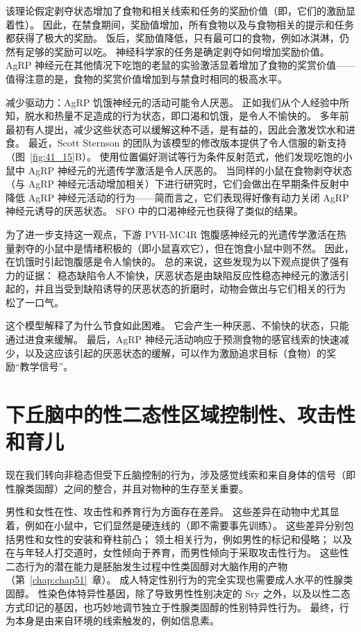 该理论假定剥夺状态增加了食物和相关线索和任务的奖励价值（即，它们的激励显着性）。
因此，在禁食期间，奖励值增加，所有食物以及与食物相关的提示和任务都获得了极大的奖励。
饭后，奖励值降低，只有最可口的食物，例如冰淇淋，仍然有足够的奖励可以吃。
神经科学家的任务是确定剥夺如何增加奖励价值。
AgRP 神经元在其他情况下吃饱的老鼠的实验激活显着增加了食物的奖赏价值——值得注意的是，食物的奖赏价值增加到与禁食时相同的极高水平。


减少驱动力：AgRP 饥饿神经元的活动可能令人厌恶。
正如我们从个人经验中所知，脱水和热量不足造成的行为状态，即口渴和饥饿，是令人不愉快的。
多年前最初有人提出，减少这些状态可以缓解这种不适，是有益的，因此会激发饮水和进食。
最近，Scott Sternson 的团队为该模型的修改版本提供了令人信服的新支持（图~\ref{fig:41_15}B）。
使用位置偏好测试等行为条件反射范式，他们发现吃饱的小鼠中 AgRP 神经元的光遗传学激活是令人厌恶的。
当同样的小鼠在食物剥夺状态（与 AgRP 神经元活动增加相关）下进行研究时，它们会做出在早期条件反射中降低 AgRP 神经元活动的行为——简而言之，它们表现得好像有动力关闭 AgRP 神经元诱导的厌恶状态。
SFO 中的口渴神经元也获得了类似的结果。


为了进一步支持这一观点，下游 PVH-MC4R 饱腹感神经元的光遗传学激活在热量剥夺的小鼠中是情绪积极的（即小鼠喜欢它），但在饱食小鼠中则不然。
因此，在饥饿时引起饱腹感是令人愉快的。
总的来说，这些发现为以下观点提供了强有力的证据：
稳态缺陷令人不愉快，厌恶状态是由缺陷反应性稳态神经元的激活引起的，并且当受到缺陷诱导的厌恶状态的折磨时，动物会做出与它们相关的行为 松了一口气。


这个模型解释了为什么节食如此困难。
它会产生一种厌恶、不愉快的状态，只能通过进食来缓解。
最后，AgRP 神经元活动响应于预测食物的感官线索的快速减少，以及这应该引起的厌恶状态的缓解，可以作为激励追求目标（食物）的奖励“教学信号”。



\section{下丘脑中的性二态性区域控制性、攻击性和育儿}

现在我们转向非稳态但受下丘脑控制的行为，涉及感觉线索和来自身体的信号（即性腺类固醇）之间的整合，并且对物种的生存至关重要。


男性和女性在性、攻击性和养育行为方面存在差异。
这些差异在动物中尤其显着，例如在小鼠中，它们显然是硬连线的（即不需要事先训练）。
这些差异分别包括男性和女性的安装和脊柱前凸；
领土相关行为，例如男性的标记和侵略； 以及在与年轻人打交道时，女性倾向于养育，而男性倾向于采取攻击性行为。
这些性二态行为的潜在能力是胚胎发生过程中性类固醇对大脑作用的产物（第~\ref{chap:chap51}~章）。
成人特定性别行为的完全实现也需要成人水平的性腺类固醇。
性染色体特异性基因，除了导致男性性别决定的 Sry 之外，以及以性二态方式印记的基因，也巧妙地调节独立于性腺类固醇的性别特异性行为。
最终，行为本身是由来自环境的线索触发的，例如信息素。


